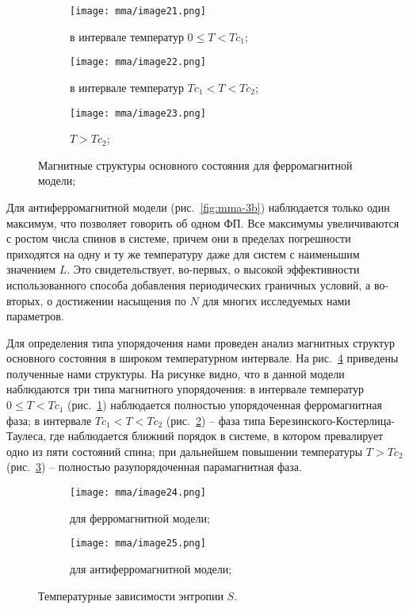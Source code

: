 \begin{figure}[ht]
    \begin{subfigure}{0.33\textwidth}
        \texttt{[image: mma/image21.png]}
        \caption{в интервале температур $0 \leq T < Tc_1$;}
        \label{fig:mma-4a}
    \end{subfigure}
    \begin{subfigure}{0.33\textwidth}
        \texttt{[image: mma/image22.png]}
        \caption{в интервале температур $Tc_1 < T < Tc_2$;}
        \label{fig:mma-4b}
    \end{subfigure}
    \begin{subfigure}{0.33\textwidth}
        \texttt{[image: mma/image23.png]}
        \caption{$T > Tc_2$;}
        \label{fig:mma-4c}
    \end{subfigure}
    \caption{Магнитные структуры основного состояния для ферромагнитной модели;}
    \label{fig:mma-4}
\end{figure}

Для антиферромагнитной модели (рис.~\ref{fig:mma-3b}) наблюдается только один максимум, что позволяет говорить об одном ФП. Все максимумы увеличиваются с ростом числа спинов в системе, причем они в пределах погрешности приходятся на одну и ту же температуру даже для систем с наименьшим значением $L$. Это свидетельствует, во-первых, о высокой эффективности использованного способа добавления периодических граничных условий, а во-вторых, о достижении насыщения по $N$ для многих исследуемых нами параметров.

Для определения типа упорядочения нами проведен анализ магнитных структур основного состояния в широком температурном интервале. На рис.~\ref{fig:mma-4} приведены полученные нами структуры. На рисунке видно, что в данной модели наблюдаются три типа магнитного упорядочения: в интервале температур $0 \leq T < Tc_1$ (рис.~\ref{fig:mma-4a}) наблюдается полностью упорядоченная ферромагнитная фаза; в интервале $Tc_1 < T < Tc_2$ (рис.~\ref{fig:mma-4b}) -- фаза типа Березинского-Костерлица-Таулеса, где наблюдается ближний порядок в системе, в котором превалирует одно из пяти состояний спина; при дальнейшем повышении температуры $T > Tc_2$ (рис.~\ref{fig:mma-4c}) -- полностью разупорядоченная парамагнитная фаза.

\begin{figure}[ht]
    \centering
    \begin{subfigure}{0.45\textwidth}
        \texttt{[image: mma/image24.png]}
        \caption{для ферромагнитной модели;}
    \end{subfigure}
    \begin{subfigure}{0.45\textwidth}
        \texttt{[image: mma/image25.png]}
        \caption{для антиферромагнитной модели;}
    \end{subfigure}
    \caption{Температурные зависимости энтропии $S$.}
    \label{fig:mma-5}
\end{figure}

